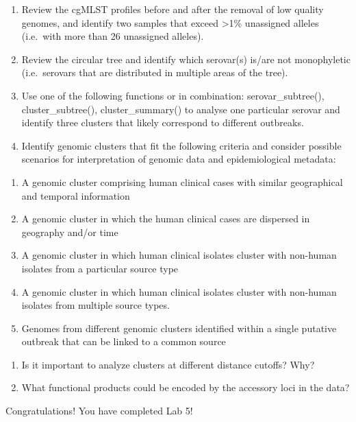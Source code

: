 \documentclass[
]{book}
\providecommand{\tightlist}{%
  \setlength{\itemsep}{0pt}\setlength{\parskip}{0pt}}
\begin{document}
\begin{enumerate}
\def\labelenumi{\arabic{enumi}.}
\item
  Review the cgMLST profiles before and after the removal of low quality genomes, and identify two samples that exceed \textgreater1\% unassigned alleles (i.e.~with more than 26 unassigned alleles).
\item
  Review the circular tree and identify which serovar(s) is/are not monophyletic (i.e.~serovars that are distributed in multiple areas of the tree).
\item
  Use one of the following functions or in combination: serovar\_subtree(), cluster\_subtree(), cluster\_summary() to analyse one particular serovar and identify three clusters that likely correspond to different outbreaks.
\item
  Identify genomic clusters that fit the following criteria and consider possible scenarios for interpretation of genomic data and epidemiological metadata:
\end{enumerate}

\begin{enumerate}
\def\labelenumi{\alph{enumi}.}
\tightlist
\item
  A genomic cluster comprising human clinical cases with similar geographical and temporal information
\item
  A genomic cluster in which the human clinical cases are dispersed in geography and/or time
\item
  A genomic cluster in which human clinical isolates cluster with non-human isolates from a particular source type
\item
  A genomic cluster in which human clinical isolates cluster with non-human isolates from multiple source types.
\item
  Genomes from different genomic clusters identified within a single putative outbreak that can be linked to a common source
\end{enumerate}

\begin{enumerate}
\def\labelenumi{\arabic{enumi}.}
\setcounter{enumi}{4}
\item
  Is it important to analyze clusters at different distance cutoffs? Why?
\item
  What functional products could be encoded by the accessory loci in the data?
\end{enumerate}

Congratulations! You have completed Lab 5!
\end{document}
